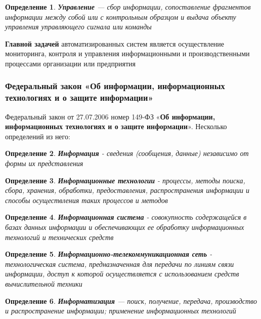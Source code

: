 \documentclass{article}
\newtheorem{definition}{Определение}
\begin{document}
\begin{definition}
    \textbf{Управление} — сбор информации, сопоставление фрагментов информации между собой или с контрольным образцом и выдача объекту управления управляющего сигнала или команды
\end{definition}

\textbf{Главной задачей} автоматизированных систем является осуществление мониторинга, контроля и управления информационными и производственными процессами организации или предприятия

\subsubsection{Федеральный закон «Об информации, информационных технологиях и о защите информации»}

Федеральный закон от 27.07.2006 номер 149-ФЗ «\textbf{Об информации, информационных технологиях и о защите информации}». Несколько определений из него:

\begin{definition}
    \textbf{Информация} - сведения (сообщения, данные) независимо от формы их представления
\end{definition}

\begin{definition}
    \textbf{Информационные технологии} - процессы, методы поиска, сбора, хранения, обработки, предоставления, распространения информации и способы осуществления таких процессов и методов
\end{definition}

\begin{definition}
    \textbf{Информационная система} - совокупность содержащейся в базах данных информации и обеспечивающих ее обработку информационных технологий и технических средств
\end{definition}

\begin{definition}
    \textbf{Информационно-телекоммуникационная сеть} - технологическая система, предназначенная для передачи по линиям связи информации, доступ к которой осуществляется с использованием средств вычислительной техники
\end{definition}

\begin{definition}
    \textbf{Информатизация} — поиск, получение, передача, производство и распространение информации; применение информационных технологий
\end{definition}
\end{document}
